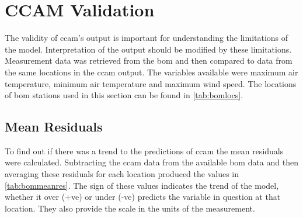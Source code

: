 \section{CCAM Validation}
\label{sec:ccamvalid}

The validity of \gls{ccam}'s output is important for understanding the limitations of the model. Interpretation of the output should be modified by these limitations. Measurement data was retrieved from the \gls{bom} and then compared to data from the same locations in the \gls{ccam} output. The variables available were maximum air temperature, minimum air temperature and maximum wind speed. The locations of \gls{bom} stations used in this section can be found in \cref{tab:bomlocs}.

\subsection{Mean Residuals}
\label{subsec:meanresiduals}

To find out if there was a trend to the predictions of \gls{ccam} the mean residuals were calculated. Subtracting the \gls{ccam} data from the available \gls{bom} data and then averaging these residuals for each location produced the values in \cref{tab:bommeanres}. The sign of these values indicates the trend of the model, whether it over (+ve) or under (-ve) predicts the variable in question at that location. They also provide the scale in the units of the measurement.

